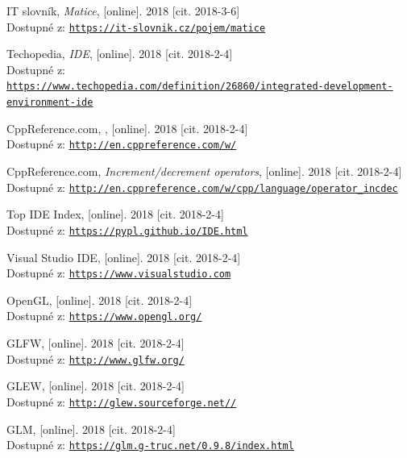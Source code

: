 \documentclass[czech,public,dept460,male,cpdeclaration]{diploma}
\begin{document}
\begin{thebibliography}{99}
	 IT slovník,
		\textit{Matice}, [online]. 2018 [cit. 2018-3-6]\\
		Dostupné z: \href{https://it-slovnik.cz/pojem/matice}{\texttt{https://it-slovnik.cz/pojem/matice}}
		
	 Techopedia,
		\textit{IDE}, [online]. 2018 [cit. 2018-2-4]\\
		Dostupné z:\\ \href{https://www.techopedia.com/definition/26860/integrated-development-environment-ide}{\texttt{https://www.techopedia.com/definition/26860/integrated-development-environment-ide}}
		
	 CppReference.com,
		, [online]. 2018 [cit. 2018-2-4]\\
		Dostupné z: \href{http://en.cppreference.com/w/}{\texttt{http://en.cppreference.com/w/}}
		
	 CppReference.com,
		\textit{Increment/decrement operators}, [online]. 2018 [cit. 2018-2-4]\\
		Dostupné z: \href{http://en.cppreference.com/w/cpp/language/operator\_incdec}{\texttt{http://en.cppreference.com/w/cpp/language/operator\_incdec}}
		
	 Top IDE Index,
		[online]. 2018 [cit. 2018-2-4]\\
		Dostupné z: \href{https://pypl.github.io/IDE.html}{\texttt{https://pypl.github.io/IDE.html}}
		
	 Visual Studio IDE,
		[online]. 2018 [cit. 2018-2-4]\\
		Dostupné z: \href{https://www.visualstudio.com}{\texttt{https://www.visualstudio.com}}
		
	 OpenGL,
		[online]. 2018 [cit. 2018-2-4]\\
		Dostupné z: \href{https://www.opengl.org/}{\texttt{https://www.opengl.org/}}
		
	 GLFW,
		[online]. 2018 [cit. 2018-2-4]\\
		Dostupné z: \href{http://www.glfw.org/}{\texttt{http://www.glfw.org/}}
		
	 GLEW,
		[online]. 2018 [cit. 2018-2-4]\\
		Dostupné z: \href{http://glew.sourceforge.net/}{\texttt{http://glew.sourceforge.net//}}
		
	 GLM,
		[online]. 2018 [cit. 2018-2-4]\\
		Dostupné z: \href{https://glm.g-truc.net/0.9.8/index.html}{\texttt{https://glm.g-truc.net/0.9.8/index.html}}
		

\end{thebibliography}
\end{document}
